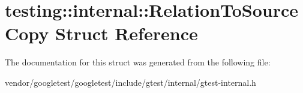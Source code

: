 \hypertarget{structtesting_1_1internal_1_1_relation_to_source_copy}{}\section{testing\+:\+:internal\+:\+:Relation\+To\+Source\+Copy Struct Reference}
\label{structtesting_1_1internal_1_1_relation_to_source_copy}


The documentation for this struct was generated from the following file\+:\begin{DoxyCompactItemize}
\item 
vendor/googletest/googletest/include/gtest/internal/gtest-\/internal.\+h\end{DoxyCompactItemize}
